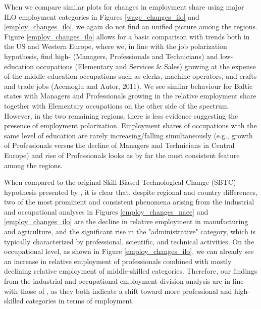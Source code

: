 \documentclass[11pt]{article}
\begin{document}
When we compare similar plots for changes in employment share using major ILO employment categories in Figures \ref{wage_changes_ilo} and \ref{employ_changes_ilo}, we again do not find an unified picture among the regions. Figure \ref{employ_changes_ilo} allows for a basic comparison with trends both in the US and Western Europe, where we, in line with the job polarization hypothesis, find high- (Managers, Professionals and Technicians) and low-education occupations (Elementary and Services \& Sales) growing at the expense of the middle-education occupations such as clerks, machine operators, and crafts and trade jobs (Acemoglu and Autor, 2011). We see similar behaviour for Baltic states with Managers and Professionals growing in the relative employment share together with Elementary occupations on the other side of the spectrum. However, in the two remaining regions, there is less evidence suggesting the presence of employment polarization. Employment shares of occupations with the same level of education are rarely increasing/falling simultaneously (e.g., growth of Professionals versus the decline of Managers and Technicians in Central Europe) and rise of Professionals looks as by far the most consistent feature among the regions.


When compared to the original Skill-Biased Technological Change (SBTC) hypothesis presented by \cite{katz1992changes}, it is clear that, despite regional and country differences, two of the most prominent and consistent phenomena arising from the industrial and occupational analyses in Figures \ref{employ_changes_nace} and \ref{employ_changes_ilo} are the decline in relative employment in manufacturing and agriculture, and the significant rise in the "administrative" category, which is typically characterized by professional, scientific, and technical activities. On the occupational level, as shown in Figure \ref{employ_changes_ilo}, we can already see an increase in relative employment of professionals combined with mostly declining relative employment of middle-skilled categories. Therefore, our findings from the industrial and occupational employment division analysis are in line with those of \cite{katz1992changes}, as they both indicate a shift toward more professional and high-skilled categories in terms of employment.
\end{document}
